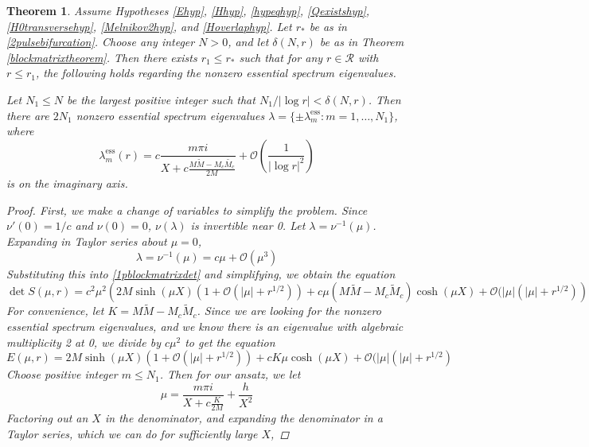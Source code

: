 \documentclass[11pt,reqno]{amsart}
\theoremstyle{plain}
\newtheorem{theorem}{Theorem}
\theoremstyle{definition}
\theoremstyle{remark}
\begin{document}
\begin{theorem}\label{theorem:1pess}
Assume Hypotheses \ref{Ehyp}, \ref{Hhyp}, \ref{hypeqhyp}, \ref{Qexistshyp}, \ref{H0transversehyp}, \ref{Melnikov2hyp}, and \ref{Hoverlaphyp}. Let $r_*$ be as in \cref{2pulsebifurcation}. Choose any integer $N > 0$, and let $\delta(N,r)$ be as in Theorem \ref{blockmatrixtheorem}. Then there exists $r_1 \leq r_*$ such that for any $r \in \mathcal{R}$ with $r \leq r_1$, the following holds regarding the nonzero essential spectrum eigenvalues. 

Let $N_1 \leq N$ be the largest positive integer such that $N_1/|\log r| < \delta(N,r)$. Then there are $2N_1$ nonzero essential spectrum eigenvalues $\lambda = \{ \pm \lambda_m^{\text{ess}} : m = 1, \dots, N_1 \}$, where
\[
\lambda_m^{\text{ess}}(r) = c \frac{m \pi i}{X + c \frac{M\tilde{M} - M_c\tilde{M_c}}{2 M}} +  \mathcal{O}\left( \frac{1}{|\log r|^2} \right)
\]
is on the imaginary axis.
\begin{proof}
First, we make a change of variables to simplify the problem. Since $\nu'(0) = 1/c$ and $\nu(0) = 0$, $\nu(\lambda)$ is invertible near 0. Let $\lambda = \nu^{-1}(\mu)$. Expanding in Taylor series about $\mu = 0$,
\begin{equation}\label{2plambdamu}
\lambda = \nu^{-1}(\mu) = c \mu + \mathcal{O}(\mu^3)
\end{equation}
Substituting this into \cref{1pblockmatrixdet} and simplifying, we obtain the equation
\begin{equation}\label{1pdetmu}
\det S(\mu, r) = c^2 \mu^2 \left( 2 M \sinh(\mu X)(1 + \mathcal{O}(|\mu| + r^{1/2})) + c \mu (M \tilde{M} - M_c \tilde{M}_c)\cosh(\mu X) + \mathcal{O}(|\mu|(|\mu| + r^{1/2}) \right)
\end{equation}
For convenience, let $K = M \tilde{M} - M_c \tilde{M}_c$. Since we are looking for the nonzero essential spectrum eigenvalues, and we know there is an eigenvalue with algebraic multiplicity 2 at 0, we divide by $c \mu^2$ to get the equation
\begin{equation}\label{1pdetmu2}
E(\mu, r) = 2 M \sinh(\mu X)(1 + \mathcal{O}(|\mu| + r^{1/2})) + c K \mu \cosh(\mu X) + \mathcal{O}(|\mu|(|\mu| + r^{1/2})
\end{equation}
Choose positive integer $m \leq N_1$. Then for our ansatz, we let
\begin{equation}
\mu = \frac{m \pi i}{X + c \frac{K}{2 M}} + \frac{h}{X^2}
\end{equation}
Factoring out an $X$ in the denominator, and expanding the denominator in a Taylor series, which we can do for sufficiently large $X$,

\end{proof}
\end{theorem}
\end{document}
